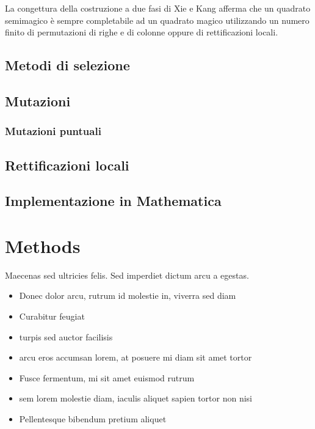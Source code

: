 \documentclass[twoside,twocolumn]{article}
\begin{document}
La congettura della costruzione a due fasi di Xie e Kang afferma che un quadrato semimagico è sempre completabile ad un quadrato magico utilizzando un numero finito di permutazioni di righe e di colonne oppure di rettificazioni locali. 

\subsection{Metodi di selezione}

\subsection{Mutazioni}

\subsubsection{Mutazioni puntuali}

\subsection{Rettificazioni locali}

\subsection{Implementazione in Mathematica}


\section{Methods}

Maecenas sed ultricies felis. Sed imperdiet dictum arcu a egestas. 
\begin{itemize}
\item Donec dolor arcu, rutrum id molestie in, viverra sed diam
\item Curabitur feugiat
\item turpis sed auctor facilisis
\item arcu eros accumsan lorem, at posuere mi diam sit amet tortor
\item Fusce fermentum, mi sit amet euismod rutrum
\item sem lorem molestie diam, iaculis aliquet sapien tortor non nisi
\item Pellentesque bibendum pretium aliquet
\end{itemize}
\blindtext %
\end{document}
